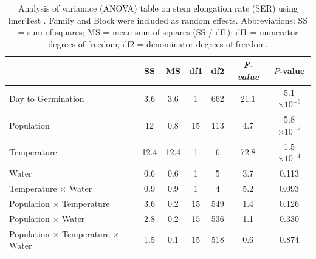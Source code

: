 \documentclass[11pt, oneside]{article}
\newcommand{\pkg}[1]{{\fontseries{b}\selectfont #1}}
\begin{document}
\begin{table}[htbp]
	\fontsize{10}{12}
	\selectfont
	\caption[ANOVA table, stem elongation rate]{Analysis of varianace (ANOVA) table on stem elongation rate (SER) using \pkg{lmerTest} \citep{Kuznetsova_etal_2016}. Family and Block were included as random effects. Abbreviations: SS = sum of squares; MS = mean sum of squares (SS / df1); df1 = numerator degrees of freedom; df2 = denominator degrees of freedom.}
	\begin{center}
	\begin{tabular}{lcccccc}
	\toprule

  & SS & MS & df1 & df2 & \em{F}-value & $P$-value \\ \midrule
  Day to Germination & 3.6 & 
    3.6 & 1 & 
    662 & 21.1 &
    5.1 $\times10^{-6}$ \\
  Population & 12 & 0.8 & 
    15 & 113 & 
    4.7 & 5.8 $\times10^{-7}$ \\
  Temperature & 12.4 & 
    12.4 & 1 &
    6 & 72.8 &
    1.5 $\times10^{-4}$ \\
  Water & 0.6 & 0.6 & 
    1 & 5 & 
    3.7 & 0.113 \\
  Temperature $\times$ Water & 0.9 & 
    0.9 & 
    1 & 
    4 & 
    5.2 &
    0.093 \\
  Population $\times$ Temperature & 3.6 & 
    0.2 & 
    15 & 
    549 & 
    1.4 &
    0.126 \\
  Population $\times$ Water & 2.8 & 
    0.2 & 
    15 &
    536 &
    1.1 & 
    0.330 \\
  Population $\times$ Temperature $\times$ Water & 
    1.5 & 
    0.1 & 
    15 & 
    518 & 
    0.6 & 
    0.874 \\
	\bottomrule
	\end{tabular}
	\label{table:TableS_fitSER}
	\end{center}
\end{table}

\end{document}
